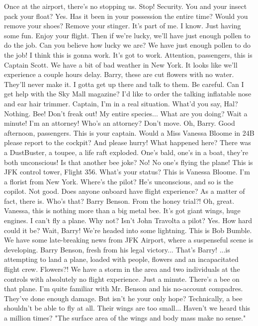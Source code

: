 \documentclass[a4paper,12pt]{article}
\begin{document}
Once at the airport, there's no stopping us.
Stop! Security.
You and your insect pack your float?
Yes.
Has it been in your possession the entire time?
Would you remove your shoes?
Remove your stinger.
It's part of me.
I know. Just having some fun.
Enjoy your flight.
Then if we're lucky, we'll have just enough pollen to do the job.
Can you believe how lucky we are? We have just enough pollen to do the job!
I think this is gonna work.
It's got to work.
Attention, passengers, this is Captain Scott. We have a bit of bad weather in New York. It looks like we'll experience a couple hours delay.
Barry, these are cut flowers with no water. They'll never make it.
I gotta get up there and talk to them.
Be careful.
Can I get help with the Sky Mall magazine? I'd like to order the talking inflatable nose and ear hair trimmer.
Captain, I'm in a real situation.
What'd you say, Hal?
Nothing.
Bee!
Don't freak out! My entire species...
What are you doing?
Wait a minute! I'm an attorney!
Who's an attorney?
Don't move.
Oh, Barry.
Good afternoon, passengers. This is your captain. Would a Miss Vanessa Bloome in 24B please report to the cockpit? And please hurry!
What happened here?
There was a DustBuster, a toupee, a life raft exploded.
One's bald, one's in a boat, they're both unconscious!
Is that another bee joke?
No!
No one's flying the plane!
This is JFK control tower, Flight 356. What's your status?
This is Vanessa Bloome. I'm a florist from New York.
Where's the pilot?
He's unconscious, and so is the copilot.
Not good. Does anyone onboard have flight experience?
As a matter of fact, there is.
Who's that?
Barry Benson.
From the honey trial?! Oh, great.
Vanessa, this is nothing more than a big metal bee.
It's got giant wings, huge engines.
I can't fly a plane.
Why not? Isn't John Travolta a pilot?
Yes.
How hard could it be?
Wait, Barry!
We're headed into some lightning.
This is Bob Bumble. We have some late-breaking news from JFK Airport, where a suspenseful scene is developing.
Barry Benson, fresh from his legal victory...
That's Barry!
...is attempting to land a plane, loaded with people, flowers and an incapacitated flight crew.
Flowers?!
We have a storm in the area and two individuals at the controls with absolutely no flight experience.
Just a minute. There's a bee on that plane.
I'm quite familiar with Mr. Benson and his no-account compadres.
They've done enough damage.
But isn't he your only hope?
Technically, a bee shouldn't be able to fly at all.
Their wings are too small... Haven't we heard this a million times?
"The surface area of the wings and body mass make no sense."
\end{document}
